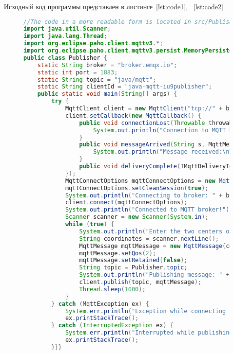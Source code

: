 \documentclass[a4paper, 14pt]{extarticle}
\begin{document}
Исходный код программы представлен в листинге~\ref{lst:code1}, ~\ref{lst:code2}

\begin{figure}[!htb]
\begin{lstlisting}[language={java},caption={Publisher.java},label={lst:code1}]
//The code in a more readable form is located in src/Publisher.java
import java.util.Scanner;
import java.lang.Thread;
import org.eclipse.paho.client.mqttv3.*;
import org.eclipse.paho.client.mqttv3.persist.MemoryPersistence;
public class Publisher {
    static String broker = "broker.emqx.io";
    static int port = 1883;
    static String topic = "java/mqtt";
    static String clientId = "java-mqtt-iu9publisher";
    public static void main(String[] args) {
        try {
            MqttClient client = new MqttClient("tcp://" + broker + ":" + port, clientId, new MemoryPersistence());
            client.setCallback(new MqttCallback() {
                public void connectionLost(Throwable throwable) {
                    System.out.println("Connection to MQTT broker lost!");
                }
                public void messageArrived(String s, MqttMessage mqttMessage) throws Exception {
                    System.out.println("Message received:\n\tTopic: " + s + "\n\tMessage: " + new String(mqttMessage.getPayload()));
                }
                public void deliveryComplete(IMqttDeliveryToken MqttDeliveryToken) {  }
            });
            MqttConnectOptions mqttConnectOptions = new MqttConnectOptions();
            mqttConnectOptions.setCleanSession(true);
            System.out.println("Connecting to broker: " + broker);
            client.connect(mqttConnectOptions);
            System.out.println("Connected to MQTT broker!");
            Scanner scanner = new Scanner(System.in);
            while (true) {
                System.out.println("Enter the two centers of circles and their radii in plane:");
                String coordinates = scanner.nextLine();
                MqttMessage mqttMessage = new MqttMessage(coordinates.getBytes());
                mqttMessage.setQos(2);
                mqttMessage.setRetained(false);
                String topic = Publisher.topic;
                System.out.println("Publishing message: " + coordinates);
                client.publish(topic, mqttMessage);
                Thread.sleep(1000);
            }
        } catch (MqttException ex) {
            System.err.println("Exception while connecting to MQTT broker: " + ex.getMessage());
            ex.printStackTrace();
        } catch (InterruptedException ex) {
            System.err.println("Interrupted while publishing messages: " + ex.getMessage());
            ex.printStackTrace();
        }}}
\end{lstlisting}
\end{figure}
\end{document}
